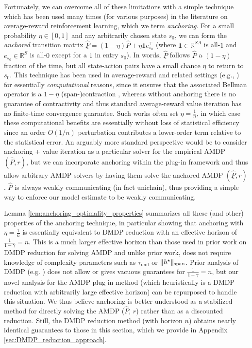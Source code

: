 \documentclass{article}
\theoremstyle{plain}
\theoremstyle{plain}
\theoremstyle{remark}
\theoremstyle{plain}
\theoremstyle{plain}
\newcommand{\R}{\mathbb{R}}
\newcommand{\Phat}{\widehat{P}}
\newcommand{\one}{\mathbf{1}}
\newcommand{\tmix}{\tau_{\mathrm{unif}}}
\newcommand{\Phatanc}{\underline{\Phat}}
\newcommand{\plugin}{plug-in\xspace}
\begin{document}
Fortunately, we can overcome all of these limitations with a simple technique which has been used many times (for various purposes) in the literature on average-reward reinforcement learning, which we term \textit{anchoring}. 
For a small probability $\eta \in [0,1]$ and any arbitrarily chosen state $s_0$, we can form the \textit{anchored} transition matrix $\Phatanc = (1-\eta) \Phat + \eta \one e_{s_0}^\top$ (where $\one \in \R^{SA}$ is all-$1$ and $e_{s_0} \in \R^S$ is all-$0$ except for a $1$ in entry $s_0$). In words, $\Phatanc$ follows $\Phat$ a $(1-\eta)$ fraction of the time, but all state-action pairs have a small chance $\eta$ to return to $s_0$. This technique has been used in average-reward and related settings (e.g., \citealt{fruit_efficient_2018, yin_offline_2022}) for essentially \textit{computational} reasons, since it ensures that the associated Bellman operator is a $1-\eta$ (span-)contraction \cite[Theorem 6.6.6]{puterman_markov_1994}, whereas without anchoring there is no guarantee of contractivity and thus standard average-reward value iteration has no finite-time convergence guarantee. Such works often set $\eta = \frac{1}{n}$, in which case these computational benefits are essentially without loss of statistical efficiency since an order $O(1/n)$ perturbation contributes a lower-order term relative to the statistical error. An arguably more standard perspective would be to consider anchoring + value iteration as a particular solver for the empirical AMDP $(\Phat, r)$, but we can incorporate anchoring within the \plugin framework and thus allow arbitrary AMDP solvers by having them solve the anchored AMDP $(\Phatanc, r)$. $\Phatanc$ is always weakly communicating (in fact unichain), thus providing a simple way to enforce our model estimate to be weakly communicating. 

Lemma \ref{lem:anchoring_optimality_properties} summarizes all these (and other) properties of the anchoring technique, in particular showing that anchoring with $\eta = \frac{1}{n}$ is essentially equivalent to DMDP reduction with an effective horizon of $\frac{1}{1-\gamma} = n$. This is a much larger effective horizon than those used in prior work on DMDP reduction for solving AMDP \citep{jin_towards_2021, wang_optimal_2023, wang_near_2022, zurek_span-based_2025} and unlike prior work, does not require knowledge of complexity parameters such as $\tmix$ or $\Vert h^\star\Vert _{\textnormal{span}}$. Prior analysis of DMDP (e.g. \cite{agarwal_model-based_2020, li_breaking_2020}) does not allow or gives vacuous guarantees for $\frac{1}{1-\gamma} = n$, but our novel analysis for the AMDP \plugin method (which heuristically is a DMDP reduction with arbitrarily large effective horizon) can be repurposed to handle this situation. We thus believe anchoring is better understood as a stabilized method for directly solving the AMDP ($\Phat$, $r$) rather than as a discounted reduction. Still, the DMDP reduction method (with horizon $n$) obtains nearly identical guarantees to those in this section, which we provide in Appendix \ref{sec:DMDP_reduction_approach}.
\end{document}
